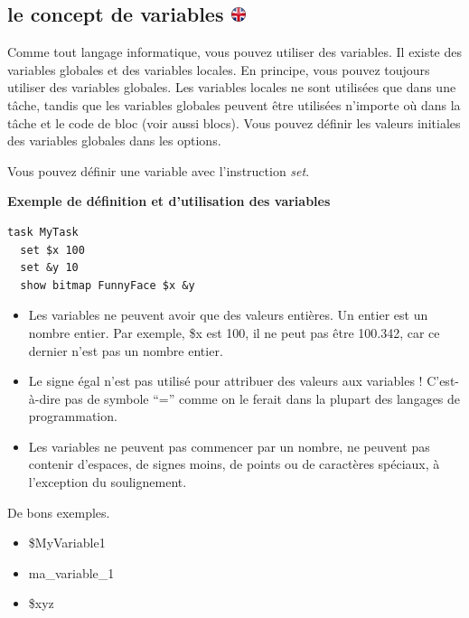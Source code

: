 \documentclass[
]{book}
\providecommand{\tightlist}{%
  \setlength{\itemsep}{0pt}\setlength{\parskip}{0pt}}
\begin{document}
\hypertarget{le-concept-de-variables}{%
\subsection[le concept de variables ]{\texorpdfstring{le concept de
variables
\href{https://www.psytoolkit.org/doc3.2.0/syntax.html\#variables-explained}{\protect\includegraphics{img/ukflag.png}}}{le concept de variables }}\label{le-concept-de-variables}}

Comme tout langage informatique, vous pouvez utiliser des variables. Il
existe des variables globales et des variables locales. En principe,
vous pouvez toujours utiliser des variables globales. Les variables
locales ne sont utilisées que dans une tâche, tandis que les variables
globales peuvent être utilisées n'importe où dans la tâche et le code de
bloc (voir aussi blocs). Vous pouvez définir les valeurs initiales des
variables globales dans les options.

Vous pouvez définir une variable avec l'instruction \emph{set}.

\textbf{Exemple de définition et d'utilisation des variables}

\begin{verbatim}
task MyTask
  set $x 100
  set &y 10
  show bitmap FunnyFace $x &y
\end{verbatim}

\begin{itemize}
\tightlist
\item
  Les variables ne peuvent avoir que des valeurs entières. Un entier est
  un nombre entier. Par exemple, \$x est 100, il ne peut pas être
  100.342, car ce dernier n'est pas un nombre entier.
\item
  Le signe égal n'est pas utilisé pour attribuer des valeurs aux
  variables ! C'est-à-dire pas de symbole ``='' comme on le ferait dans
  la plupart des langages de programmation.
\item
  Les variables ne peuvent pas commencer par un nombre, ne peuvent pas
  contenir d'espaces, de signes moins, de points ou de caractères
  spéciaux, à l'exception du soulignement.
\end{itemize}

De bons exemples.

\begin{itemize}
\tightlist
\item
  \$MyVariable1
\item
  ma\_variable\_1
\item
  \$xyz
\end{itemize}
\end{document}
